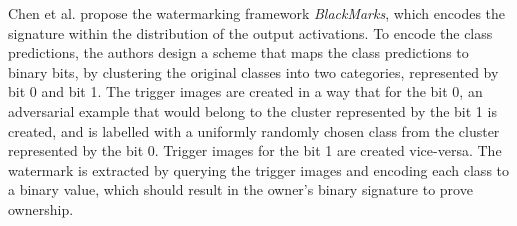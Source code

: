 Chen et al. \cite{chen_blackmarks_2019} propose the watermarking framework \textit{BlackMarks}, which %
encodes the signature within the distribution of the output activations. %
To encode the class predictions, the authors design a scheme that maps the class predictions to binary bits, by clustering the original classes into two categories, represented by bit 0 and bit 1. The trigger images are created in a way that for the bit 0, an adversarial example that would belong to the cluster represented by the bit 1 is created, and is labelled with a uniformly randomly chosen class from the cluster represented by the bit 0. Trigger images for the bit 1 are created vice-versa. The watermark is extracted by querying the trigger images and encoding each class to a binary value, which should result in the owner's binary signature to prove ownership.

